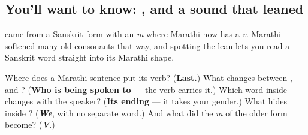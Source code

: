 \subsection*{You'll want to know: , and a sound that leaned}
\textbf{} came from a Sanskrit form with an \emph{m} where Marathi now has a \emph{v}. Marathi softened many old consonants that way, and spotting the lean lets you read a Sanskrit word straight into its Marathi shape.

\begin{tcolorbox}[breakable,colback=teal!4,colframe=teal!35!black,title={Before you move on}]
Where does a Marathi sentence put its verb? (\textbf{Last.}) What changes between \emph{}, \emph{} and \emph{}? (\textbf{Who is being spoken to} — the verb carries it.) Which word inside \emph{} changes with the speaker? (\textbf{Its ending} — it takes your gender.) What hides inside \textbf{}? (\emph{\textbf{We}}, with no separate word.) And what did the \emph{m} of the older form become? (\emph{\textbf{V}}.)
\end{tcolorbox}
